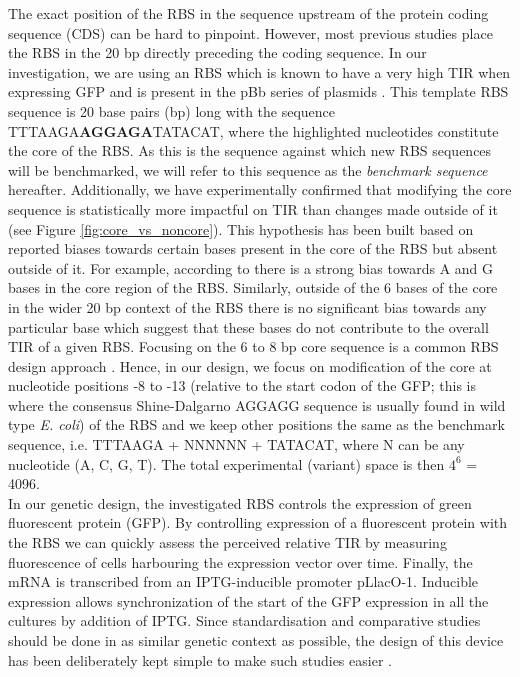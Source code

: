 \documentclass{scrartcl}[2013/05/29]%
\begin{document}
The exact position of the RBS in the sequence upstream of the protein coding sequence (CDS) can be hard to pinpoint.
However, most previous studies place the RBS in the 20 bp directly preceding the coding sequence.
In our investigation, we are using an RBS which is known to have a very high TIR when expressing GFP and is present in the pBb series of plasmids \cite{Lee2011}.
This template RBS sequence is 20 base pairs (bp) long with the sequence TTTAAGA\textbf{AGGAGA}TATACAT, where the highlighted nucleotides constitute the core of the RBS.
As this is the sequence against which new RBS sequences will be benchmarked,
we will refer to this sequence as the \textit{benchmark sequence} hereafter.
Additionally, we have experimentally confirmed that modifying the core sequence is statistically more impactful on TIR than changes made outside of it (see Figure \ref{fig:core_vs_noncore}).
This hypothesis has been built based on reported biases towards certain bases present in the core of the RBS but absent outside of it.
For example, according to \cite{SHULTZABERGER2001} there is a strong bias towards A and G bases in the core region of the RBS.
Similarly, outside of the 6 bases of the core in the wider 20 bp context of the RBS there is no significant bias towards any particular base which suggest that these bases do not contribute to the overall TIR of a given RBS.
Focusing on the 6 to 8 bp core sequence is a common RBS design approach \cite{Jeschek2016}.
Hence, in our design, we focus on modification of the core at nucleotide positions -8 to -13 (relative to the start codon of the GFP; this is where the consensus Shine-Dalgarno AGGAGG sequence is usually found in wild type \textit{E. coli}) of the RBS and we keep other positions the same as the benchmark sequence, i.e. TTTAAGA + NNNNNN + TATACAT, where N can be any nucleotide (A, C, G, T).
The total experimental (variant) space is then $4^6$ = 4096.\\

In our genetic design, the investigated RBS controls the expression of green fluorescent protein (GFP).
By controlling expression of a fluorescent protein with the RBS we can quickly assess the perceived relative TIR by measuring fluorescence of cells harbouring the expression vector over time.
Finally, the mRNA is transcribed from an IPTG-inducible promoter pLlacO-1.
Inducible expression allows synchronization of the start of the GFP expression in all the cultures by addition of IPTG.
Since standardisation and comparative studies should be done in as similar genetic context as possible, the design of this device has been deliberately kept simple to make such studies easier \cite{Beal2021}.\\
\end{document}
